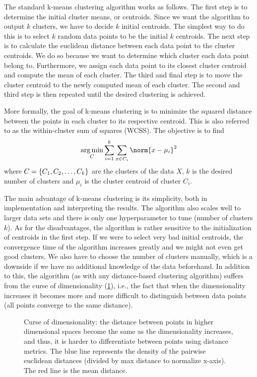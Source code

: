 The standard k-means clustering algorithm works as follows. The first step is to determine the initial cluster means, or centroids. Since we want the algorithm to output $k$ clusters, we have to decide $k$ initial centroids. The simplest way to do this is to select $k$ random data points to be the initial $k$ centroids. The next step is to calculate the euclidean distance between each data point to the cluster centroids. We do so because we want to determine which cluster each data point belong to. Furthermore, we assign each data point to its closest cluster centroid and compute the mean of each cluster. The third and final step is to move the cluster centroid to the newly computed mean of each cluster. The second and third step is then repeated until the desired clustering is achieved.

More formally, the goal of k-means clustering is to minimize the squared distance between the points in each cluster to its respective centroid. This is also referred to as the within-cluster sum of squares (WCSS). The objective is to find
\begin{align}
    \argmin_{C} \sumlim{i=1}{k} \sumlim{x \in C_i}{} \norm{x - \mu_i}^2
\end{align}
where $C = \left\{C_1, C_2, \ldots, C_k\right\}$ are the clusters of the data $X$, $k$ is the desired number of clusters and $\mu_i$ is the cluster centroid of cluster $C_i$.

The main advantage of k-means clustering is its simplicity, both in implementation and interpreting the results. The algorithm also scales well to larger data sets and there is only one hyperparameter to tune (number of clusters $k$). As for the disadvantages, the algorithm is rather sensitive to the initialization of centroids in the first step. If we were to select very bad initial centroids, the convergence time of the algorithm increases greatly and we might not even get good clusters. We also have to choose the number of clusters manually, which is a downside if we have no additional knowledge of the data beforehand. In addition to this, the algorithm (as with any distance-based clustering algorithm) suffers from the curse of dimensionality (\cref{fig:curse-of-dimensionality}), i.e., the fact that when the dimensionality increases it becomes more and more difficult to distinguish between data points (all points converge to the same distance).

\begin{figure}[H]
    \centering
    
    \caption{Curse of dimensionality: the distance between points in higher dimensional spaces become the same as the dimensionality increases, and thus, it is harder to differentiate between points using distance metrics. The blue line represents the density of the pairwise euclidean distances (divided by max distance to normalize x-axis). The red line is the mean distance.}
    \label{fig:curse-of-dimensionality}
\end{figure}


